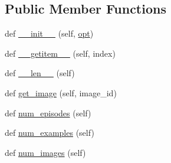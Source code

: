\subsection*{Public Member Functions}
\begin{DoxyCompactItemize}
\item 
def \hyperlink{classparlai_1_1tasks_1_1vqa__v1_1_1agents_1_1VQADataset_a0d660907fd4d3bb3644c139308223ec0}{\+\_\+\+\_\+init\+\_\+\+\_\+} (self, \hyperlink{classparlai_1_1tasks_1_1vqa__v1_1_1agents_1_1VQADataset_a0af1b5bdd7f93896ab44f4d90be56fdf}{opt})
\item 
def \hyperlink{classparlai_1_1tasks_1_1vqa__v1_1_1agents_1_1VQADataset_a2212cb2961827b893bc0d3354c305f66}{\+\_\+\+\_\+getitem\+\_\+\+\_\+} (self, index)
\item 
def \hyperlink{classparlai_1_1tasks_1_1vqa__v1_1_1agents_1_1VQADataset_af309d827a13fba8f616f8608821f5543}{\+\_\+\+\_\+len\+\_\+\+\_\+} (self)
\item 
def \hyperlink{classparlai_1_1tasks_1_1vqa__v1_1_1agents_1_1VQADataset_a416fc9e62c61ffa6b56b9e63b5d56132}{get\+\_\+image} (self, image\+\_\+id)
\item 
def \hyperlink{classparlai_1_1tasks_1_1vqa__v1_1_1agents_1_1VQADataset_a13cd291a46199ed9f505e5948ef25278}{num\+\_\+episodes} (self)
\item 
def \hyperlink{classparlai_1_1tasks_1_1vqa__v1_1_1agents_1_1VQADataset_aa020148e5e52ba91fcedcb3aaf129643}{num\+\_\+examples} (self)
\item 
def \hyperlink{classparlai_1_1tasks_1_1vqa__v1_1_1agents_1_1VQADataset_a35425d8a31193d50ad5b1c558322ea93}{num\+\_\+images} (self)
\end{DoxyCompactItemize}
